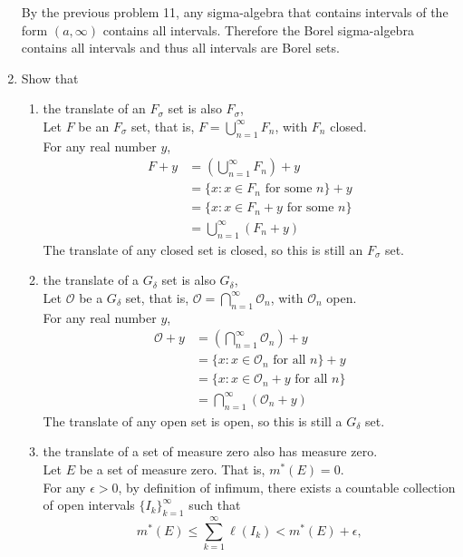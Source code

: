 \begin{enumerate}
	By the previous problem 11, any sigma-algebra that contains intervals of the form $(a,\infty)$ contains all intervals. 
	Therefore the Borel sigma-algebra contains all intervals and thus all intervals are Borel sets.
	\item Show that 
	\begin{enumerate}[label=(\roman*),align=left]                                                                                                         
        \item the translate of an $F_\sigma$ set is also $F_\sigma$,\\
        Let $F$ be an $F_\sigma$ set, that is, $F=\bigcup_{n=1}^\infty F_n$, with $F_n$ closed. \\
		For any real number $y$,
        \begin{align*}
			F+y&=(\bigcup_{n=1}^\infty F_n)+y\\
			&=\{x:x\in F_n\text{ for some }n\}+y\\
			&=\{x:x\in F_n+y\text{ for some }n\}\\
			&=\bigcup_{n=1}^\infty (F_n+y)
		\end{align*}
		The translate of any closed set is closed, so this is still an $F_\sigma$ set.
        \item the translate of a $G_\delta$ set is also $G_\delta$,\\
        Let $\mathcal{O}$ be a $G_\delta$ set, that is, $\mathcal{O}=\bigcap_{n=1}^\infty \mathcal{O}_n$, with $\mathcal{O}_n$ open.\\
        For any real number $y$,
		\begin{align*}
			\mathcal{O}+y&=(\bigcap_{n=1}^\infty \mathcal{O}_n)+y\\
			&=\{x:x\in \mathcal{O}_n\text{ for all }n\}+y\\
			&=\{x:x\in \mathcal{O}_n+y\text{ for all }n\}\\
			&=\bigcap_{n=1}^\infty (\mathcal{O}_n+y)
		\end{align*}
		The translate of any open set is open, so this is still a $G_\delta$ set.
        \item the translate of a set of measure zero also has measure zero.\\
        Let $E$ be a set of measure zero. That is, $m^*(E)=0$.\\
		For any $\epsilon>0$, by definition of infimum, there exists a countable collection of open intervals $\{I_k\}_{k=1}^\infty$ such that  
		\[
		m^*(E)\le\sum_{k=1}^\infty \ell(I_k) <m^*(E)+\epsilon,
		\]

\end{enumerate}
\end{enumerate}
